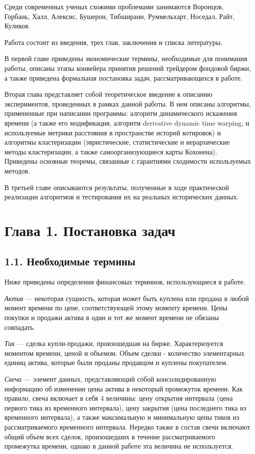 \documentclass[12pt]{article}
\begin{document}
Среди современных ученых схожими проблемами занимаются Воронцов, Горбань, Халл, Алексис, Бушерон, Тибширани, Руммельхарт, Носедал, Райт, Куликов.

Работа состоит из введения, трех глав, заключения и списка литературы.

В первой главе приведены экономические термины, необходимые для понимания работы, описаны этапы конвейера принятия решений трейдером фондовой биржи, а также приведена формальная постановка задач, рассматривающихся в работе.

Вторая глава представляет собой теоретическое введение к описанию экспериментов, проведенных в рамках данной работы. В нем описаны алгоритмы, примененные при написании программы: алгоритм динамического искажения времени (а также его модификация, алгоритм derivative dynamic time warping, и используемые метрики расстояния в пространстве историй котировок) и алгоритмы кластеризации (эвристические, статистические и иерархические методы кластеризации, а также самоорганизующиеся карты Кохонена). Приведены основные теоремы, связанные с гарантиями сходимости используемых методов.

В третьей главе описываются результаты, полученные в ходе практической реализации алгоритмов и тестирования их на реальных исторических данных.
\section{Глава 1. Постановка задач}
\subsection{1.1. Необходимые термины}
Ниже приведены определения финансовых терминов, использующиеся в работе.

{\it Актив} --- некоторая сущность, которая может быть куплена или продана в любой момент времени по цене, соответствующей этому моменту времени. Цены покупки и продажи актива в один и тот же момент времени не обязаны совпадать.

{\it Тик} --- сделка купли-продажи, произошедшая на бирже. Характеризуется моментом времени, ценой и объемом. Объем сделки - количество элементарных единиц актива, которые были проданы продавцом и куплены покупателем.

{\it Свеча} --- элемент данных, представляющий собой консолидированную информацию об изменении цены актива в некоторый промежуток времени. Как правило, свеча включает в себя 4 величины: цену открытия интервала (цена первого тика из временного интервала), цену закрытия (цена последнего тика из временного интервала), а также максимальную и минимальную цены тиков из рассматриваемого временного интервала. Нередко также в состав свечи включают общий объем всех сделок, произошедших в течение рассматриваемого промежутка времени, однако в данной работе эта величина не используется.
\end{document}
